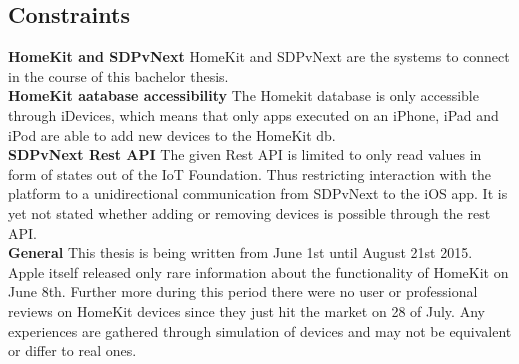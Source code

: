 





	\subsection{Constraints}

		\textbf{HomeKit and SDPvNext}
			HomeKit and SDPvNext are the systems to connect in the course of this bachelor thesis.\\

		\textbf{HomeKit aatabase accessibility}
			The Homekit database is only accessible through iDevices, which means that only apps executed on an iPhone, iPad and iPod are able to add new devices to the HomeKit db.\\

		\textbf{SDPvNext Rest API}
			The given Rest API is limited to only read values in form of states out of the IoT Foundation. Thus restricting interaction with the platform to a unidirectional communication from SDPvNext to the iOS app. It is yet not stated whether adding or removing devices is possible through the rest API.\\


		\textbf{General}
			This thesis is being written from June 1st until August 21st 2015. Apple itself released only rare information about the functionality of HomeKit on June 8th. Further more during this period there were no user or professional reviews on HomeKit devices since they just hit the market on 28 of July. Any experiences are gathered through simulation of devices and may not be equivalent or differ to real ones.\\

